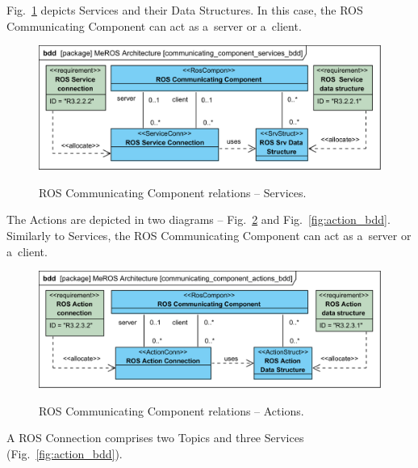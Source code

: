 \documentclass[11pt,oneside,a4paper]{report}
\begin{document}
	\pagebreak
	
	Fig.~\ref{fig:communication_blocks_services_bdd} depicts Services and their Data Structures. In this case, the ROS Communicating Component can act as a~server or a~client.	
	
		
	\begin{figure}[H]
		\centering
		\begin{center}
			{\includegraphics[scale=1.0]{diagrams/communicating_component_services_bdd.png}}
		\end{center}
		\caption{ROS Communicating Component relations -- Services.} 
		\label{fig:communication_blocks_services_bdd}
	\end{figure}
		
	The Actions are depicted in two diagrams -- Fig.~\ref{fig:communicating_component_actions_bdd} and Fig.~\ref{fig:action_bdd}. Similarly to Services, the ROS Communicating Component can act as a~server or a~client.	 
	
	
	\begin{figure}[H]
		\centering
		\begin{center}
			{\includegraphics[scale=1.0]{diagrams/communicating_component_actions_bdd.png}}
		\end{center}
		\caption{ROS Communicating Component relations -- Actions.} 
		\label{fig:communicating_component_actions_bdd}
	\end{figure}
	
	A ROS Connection comprises two Topics and three Services (Fig.~\ref{fig:action_bdd}).
	
\end{document}
